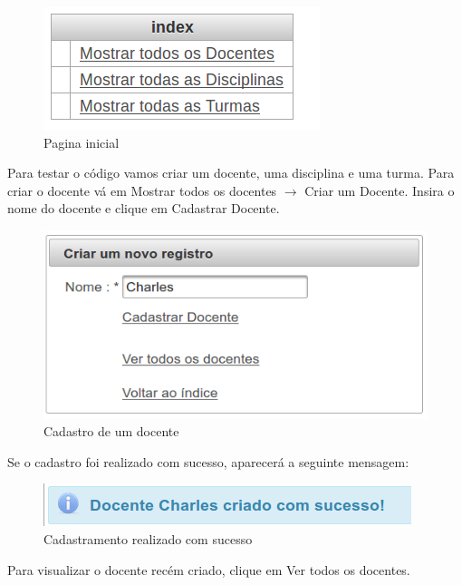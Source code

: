 \documentclass[12pt,a4paper]{article}
\begin{document}
\begin{figure}[H]
    \centering
    \includegraphics[scale=0.50]{index.png}
    \caption{Pagina inicial}
    \label{imagemindex}
\end{figure}

Para testar o código vamos criar um docente, uma disciplina e uma turma. Para criar o docente vá em Mostrar todos os docentes $\rightarrow$ Criar um Docente. Insira o nome do docente e clique em Cadastrar Docente.

\begin{figure}[H]
    \centering
    \includegraphics[scale=0.45]{criarDocente.png}
    \caption{Cadastro de um docente}
    \label{criarDocente}
\end{figure}

Se o cadastro foi realizado com sucesso, aparecerá a seguinte mensagem:
\begin{figure}[H]
    \centering
    \includegraphics[scale=0.50]{mensagemSucesso.png}
    \caption{Cadastramento realizado com sucesso}
    \label{mensagemSucesso}
\end{figure}

Para visualizar o docente recém criado, clique em Ver todos os docentes.\\
\end{document}
